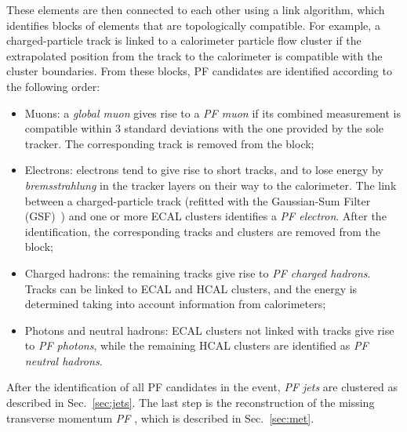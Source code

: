 These elements are then connected to each other using a link algorithm, which identifies blocks of elements that are topologically compatible. For example, a charged-particle track is linked to a calorimeter particle flow cluster if the extrapolated position from the track to the calorimeter is compatible with the cluster boundaries. From these blocks, PF candidates are identified according to the following order:
\begin{itemize}
\item Muons: a \emph{global muon} gives rise to a \emph{PF muon} if its combined \pt measurement is compatible within 3 standard deviations with the one provided by the sole tracker. The corresponding track is removed from the block;
\item Electrons: electrons tend to give rise to short tracks, and to lose energy by \emph{bremsstrahlung} in the tracker layers on their way to the calorimeter. The link between a charged-particle track (refitted with the Gaussian-Sum Filter (GSF)~\cite{Adam:815410}) and one or more ECAL clusters identifies a \emph{PF electron}. After the identification, the corresponding tracks and clusters are removed from the block;
\item Charged hadrons: the remaining tracks give rise to \emph{PF charged hadrons}. Tracks can be linked to ECAL and HCAL clusters, and the energy is determined taking into account information from calorimeters;
\item Photons and neutral hadrons: ECAL clusters not linked with tracks give rise to \emph{PF photons}, while the remaining HCAL clusters are identified as \emph{PF neutral hadrons}.
\end{itemize}
After the identification of all PF candidates in the event, \emph{PF jets} are clustered as described in Sec.~\ref{sec:jets}. The last step is the reconstruction of the missing transverse momentum \emph{PF \ptmiss}, which is described in Sec.~\ref{sec:met}.
